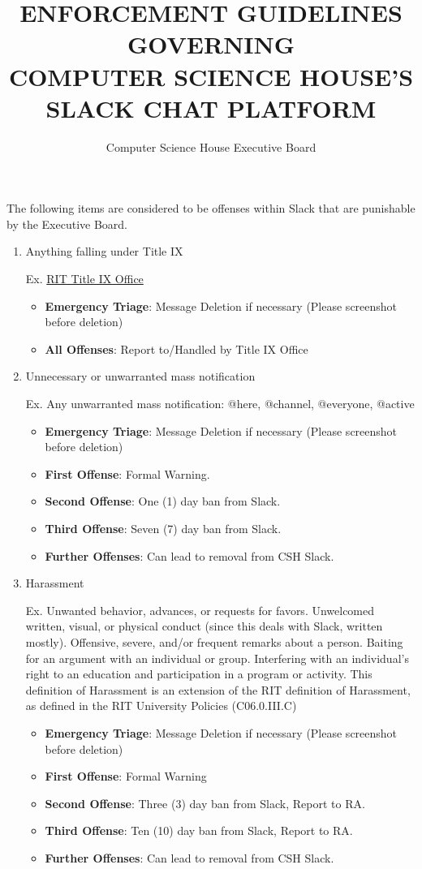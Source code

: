 \documentclass{article}
\title{
ENFORCEMENT GUIDELINES GOVERNING\\
\textbf{COMPUTER SCIENCE HOUSE'S}\\
SLACK CHAT PLATFORM}
\author{Computer Science House Executive Board}
\date{\datechanged}
\begin{document}
\maketitle

The following items are considered to be offenses within Slack that are punishable by the Executive Board.

\begin{enumerate}[I]
\item Anything falling under Title IX

Ex. \href{https://www.rit.edu/fa/compliance/title-ix}{RIT Title IX Office}
\begin{itemize}
    \item \textbf{Emergency Triage}: Message Deletion if necessary (Please screenshot before deletion)
    \item \textbf{All Offenses}: Report to/Handled by Title IX Office
\end{itemize}

\item Unnecessary or unwarranted mass notification

Ex. Any unwarranted mass notification: @here, @channel, @everyone, @active
\begin{itemize}
    \item \textbf{Emergency Triage}: Message Deletion if necessary (Please screenshot before deletion)
    \item \textbf{First Offense}: Formal Warning.
    \item \textbf{Second Offense}: One (1) day ban from Slack.
    \item \textbf{Third Offense}: Seven (7) day ban from Slack.
    \item \textbf{Further Offenses}: Can lead to removal from CSH Slack.
\end{itemize}

\item Harassment

Ex. Unwanted behavior, advances, or requests for favors. Unwelcomed written, visual, or physical conduct (since this deals with Slack, written mostly). Offensive, severe, and/or frequent remarks about a person. Baiting for an argument with an individual or group. Interfering with an individual's right to an education and participation in a program or activity. This definition of Harassment is an extension of the RIT definition of Harassment, as defined in the RIT University Policies (C06.0.III.C)
\begin{itemize}
    \item \textbf{Emergency Triage}: Message Deletion if necessary (Please screenshot before deletion)
    \item \textbf{First Offense}: Formal Warning
    \item \textbf{Second Offense}: Three (3) day ban from Slack, Report to RA.
    \item \textbf{Third Offense}: Ten (10) day ban from Slack, Report to RA.
    \item \textbf{Further Offenses}: Can lead to removal from CSH Slack.
\end{itemize}


\end{enumerate}
\end{document}

